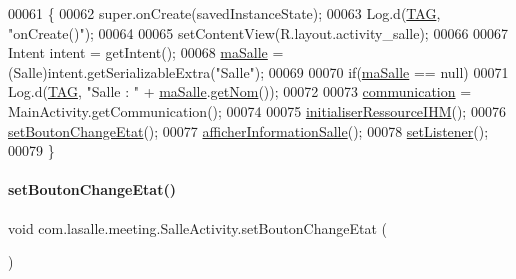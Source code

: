 \begin{DoxyCode}
00061     \{
00062         super.onCreate(savedInstanceState);
00063         Log.d(\hyperlink{classcom_1_1lasalle_1_1meeting_1_1_salle_activity_a70adba176c2984edf5ae1b188017ac25}{TAG}, \textcolor{stringliteral}{"onCreate()"});
00064 
00065         setContentView(R.layout.activity\_salle);
00066 
00067         Intent intent = getIntent();
00068         \hyperlink{classcom_1_1lasalle_1_1meeting_1_1_salle_activity_a7ae6e92ee66fa15d999f166f40738648}{maSalle} = (Salle)intent.getSerializableExtra(\textcolor{stringliteral}{"Salle"});
00069 
00070         \textcolor{keywordflow}{if}(\hyperlink{classcom_1_1lasalle_1_1meeting_1_1_salle_activity_a7ae6e92ee66fa15d999f166f40738648}{maSalle} == null)
00071             Log.d(\hyperlink{classcom_1_1lasalle_1_1meeting_1_1_salle_activity_a70adba176c2984edf5ae1b188017ac25}{TAG}, \textcolor{stringliteral}{"Salle : "} + \hyperlink{classcom_1_1lasalle_1_1meeting_1_1_salle_activity_a7ae6e92ee66fa15d999f166f40738648}{maSalle}.\hyperlink{classcom_1_1lasalle_1_1meeting_1_1_salle_a49d977f69b2783e8ad57eccffc29e97b}{getNom}());
00072 
00073         \hyperlink{classcom_1_1lasalle_1_1meeting_1_1_salle_activity_ab57d7397514ed7256304b0784f8ea7bf}{communication} = MainActivity.getCommunication();
00074 
00075         \hyperlink{classcom_1_1lasalle_1_1meeting_1_1_salle_activity_af41d9cf11c5032e1c44b7e8f08b8211a}{initialiserRessourceIHM}();
00076         \hyperlink{classcom_1_1lasalle_1_1meeting_1_1_salle_activity_a6b2086a70d8c1dc9841663029793ff00}{setBoutonChangeEtat}();
00077         \hyperlink{classcom_1_1lasalle_1_1meeting_1_1_salle_activity_aee6f0cd7a9029d5fbe12bf85c2316f82}{afficherInformationSalle}();
00078         \hyperlink{classcom_1_1lasalle_1_1meeting_1_1_salle_activity_a6d9b28a6a25b91ea9632ec4105dd33cf}{setListener}();
00079     \}
\end{DoxyCode}
\mbox{\label{classcom_1_1lasalle_1_1meeting_1_1_salle_activity_a6b2086a70d8c1dc9841663029793ff00}} 
\paragraph{\texorpdfstring{set\+Bouton\+Change\+Etat()}{setBoutonChangeEtat()}}
{\footnotesize\ttfamily void com.\+lasalle.\+meeting.\+Salle\+Activity.\+set\+Bouton\+Change\+Etat (\begin{DoxyParamCaption}{ }\end{DoxyParamCaption})}



